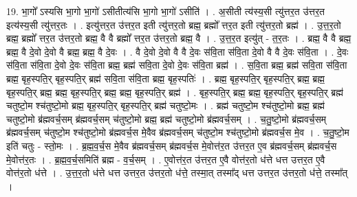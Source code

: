 \documentclass[17pt]{extarticle}
\begin{document}
19. भा॒गो᳚ ऽस्यसि भा॒गो भा॒गो॑ ऽसीतीत्य॑सि भा॒गो भा॒गो॑ ऽसीति॑ । . अ॒सीती त्य॑स्य॒सी त्यु॑त्तर॒त उ॑त्तर॒त इत्य॑स्य॒सी त्यु॑त्तर॒तः । . इत्यु॑त्तर॒त उ॑त्तर॒त इती त्यु॑त्तर॒तो ब्रह्म॒ ब्रह्मो᳚ त्तर॒त इती त्यु॑त्तर॒तो ब्रह्म॑ । . उ॒त्त॒र॒तो ब्रह्म॒ ब्रह्मो᳚ त्तर॒त उ॑त्तर॒तो ब्रह्म॒ वै वै ब्रह्मो᳚ त्तर॒त उ॑त्तर॒तो ब्रह्म॒ वै । . उ॒त्त॒र॒त इत्यु॑त् - त॒र॒तः । . ब्रह्म॒ वै वै ब्रह्म॒ ब्रह्म॒ वै दे॒वो दे॒वो वै ब्रह्म॒ ब्रह्म॒ वै दे॒वः । . वै दे॒वो दे॒वो वै वै दे॒वः स॑वि॒ता स॑वि॒ता दे॒वो वै वै दे॒वः स॑वि॒ता । . दे॒वः स॑वि॒ता स॑वि॒ता दे॒वो दे॒वः स॑वि॒ता ब्रह्म॒ ब्रह्म॑ सवि॒ता दे॒वो दे॒वः स॑वि॒ता ब्रह्म॑ । . स॒वि॒ता ब्रह्म॒ ब्रह्म॑ सवि॒ता स॑वि॒ता ब्रह्म॒ बृह॒स्पति॒र् बृह॒स्पति॒र् ब्रह्म॑ सवि॒ता स॑वि॒ता ब्रह्म॒ बृह॒स्पतिः॑ । . ब्रह्म॒ बृह॒स्पति॒र् बृह॒स्पति॒र् ब्रह्म॒ ब्रह्म॒ बृह॒स्पति॒र् ब्रह्म॒ ब्रह्म॒ बृह॒स्पति॒र् ब्रह्म॒ ब्रह्म॒ बृह॒स्पति॒र् ब्रह्म॑ । . बृह॒स्पति॒र् ब्रह्म॒ ब्रह्म॒ बृह॒स्पति॒र् बृह॒स्पति॒र् ब्रह्म॑ चतुष्टो॒म श्च॑तुष्टो॒मो ब्रह्म॒ बृह॒स्पति॒र् बृह॒स्पति॒र् ब्रह्म॑ चतुष्टो॒मः । . ब्रह्म॑ चतुष्टो॒म श्च॑तुष्टो॒मो ब्रह्म॒ ब्रह्म॑ चतुष्टो॒मो ब्र॑ह्मवर्च॒सम् ब्र॑ह्मवर्च॒सम् च॑तुष्टो॒मो ब्रह्म॒ ब्रह्म॑ चतुष्टो॒मो ब्र॑ह्मवर्च॒सम् । . च॒तु॒ष्टो॒मो ब्र॑ह्मवर्च॒सम् ब्र॑ह्मवर्च॒सम् च॑तुष्टो॒म श्च॑तुष्टो॒मो ब्र॑ह्मवर्च॒स मे॒वैव ब्र॑ह्मवर्च॒सम् च॑तुष्टो॒म श्च॑तुष्टो॒मो ब्र॑ह्मवर्च॒स मे॒व । . च॒तु॒ष्टो॒म इति॑ चतुः - स्तो॒मः । . ब्र॒ह्म॒व॒र्च॒स मे॒वैव ब्र॑ह्मवर्च॒सम् ब्र॑ह्मवर्च॒स मे॒वोत्त॑र॒त उ॑त्तर॒त ए॒व ब्र॑ह्मवर्च॒सम् ब्र॑ह्मवर्च॒स मे॒वोत्त॑र॒तः । . ब्र॒ह्म॒व॒र्च॒समिति॑ ब्रह्म - व॒र्च॒सम् । . ए॒वोत्त॑र॒त उ॑त्तर॒त ए॒वै वोत्त॑र॒तो ध॑त्ते धत्त उत्तर॒त ए॒वै वोत्त॑र॒तो ध॑त्ते । . उ॒त्त॒र॒तो ध॑त्ते धत्त उत्तर॒त उ॑त्तर॒तो ध॑त्ते॒ तस्मा॒त् तस्मा᳚द् धत्त उत्तर॒त उ॑त्तर॒तो ध॑त्ते॒ तस्मा᳚त् । \newline
\end{document}
